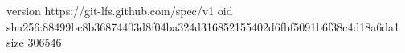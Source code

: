 version https://git-lfs.github.com/spec/v1
oid sha256:88499bc8b36874403d8f04ba324d316852155402d6fbf5091b6f38c4d18a6da1
size 306546
